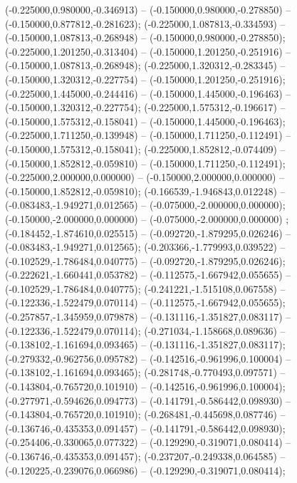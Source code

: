  (-0.225000,0.980000,-0.346913) -- (-0.150000,0.980000,-0.278850) -- (-0.150000,0.877812,-0.281623);
 (-0.225000,1.087813,-0.334593) -- (-0.150000,1.087813,-0.268948) -- (-0.150000,0.980000,-0.278850);
 (-0.225000,1.201250,-0.313404) -- (-0.150000,1.201250,-0.251916) -- (-0.150000,1.087813,-0.268948);
 (-0.225000,1.320312,-0.283345) -- (-0.150000,1.320312,-0.227754) -- (-0.150000,1.201250,-0.251916);
 (-0.225000,1.445000,-0.244416) -- (-0.150000,1.445000,-0.196463) -- (-0.150000,1.320312,-0.227754);
 (-0.225000,1.575312,-0.196617) -- (-0.150000,1.575312,-0.158041) -- (-0.150000,1.445000,-0.196463);
 (-0.225000,1.711250,-0.139948) -- (-0.150000,1.711250,-0.112491) -- (-0.150000,1.575312,-0.158041);
 (-0.225000,1.852812,-0.074409) -- (-0.150000,1.852812,-0.059810) -- (-0.150000,1.711250,-0.112491);
 (-0.225000,2.000000,0.000000) -- (-0.150000,2.000000,0.000000) -- (-0.150000,1.852812,-0.059810);
 (-0.166539,-1.946843,0.012248) -- (-0.083483,-1.949271,0.012565) -- (-0.075000,-2.000000,0.000000);
 (-0.150000,-2.000000,0.000000) -- (-0.075000,-2.000000,0.000000) ;
 (-0.184452,-1.874610,0.025515) -- (-0.092720,-1.879295,0.026246) -- (-0.083483,-1.949271,0.012565);
 (-0.203366,-1.779993,0.039522) -- (-0.102529,-1.786484,0.040775) -- (-0.092720,-1.879295,0.026246);
 (-0.222621,-1.660441,0.053782) -- (-0.112575,-1.667942,0.055655) -- (-0.102529,-1.786484,0.040775);
 (-0.241221,-1.515108,0.067558) -- (-0.122336,-1.522479,0.070114) -- (-0.112575,-1.667942,0.055655);
 (-0.257857,-1.345959,0.079878) -- (-0.131116,-1.351827,0.083117) -- (-0.122336,-1.522479,0.070114);
 (-0.271034,-1.158668,0.089636) -- (-0.138102,-1.161694,0.093465) -- (-0.131116,-1.351827,0.083117);
 (-0.279332,-0.962756,0.095782) -- (-0.142516,-0.961996,0.100004) -- (-0.138102,-1.161694,0.093465);
 (-0.281748,-0.770493,0.097571) -- (-0.143804,-0.765720,0.101910) -- (-0.142516,-0.961996,0.100004);
 (-0.277971,-0.594626,0.094773) -- (-0.141791,-0.586442,0.098930) -- (-0.143804,-0.765720,0.101910);
 (-0.268481,-0.445698,0.087746) -- (-0.136746,-0.435353,0.091457) -- (-0.141791,-0.586442,0.098930);
 (-0.254406,-0.330065,0.077322) -- (-0.129290,-0.319071,0.080414) -- (-0.136746,-0.435353,0.091457);
 (-0.237207,-0.249338,0.064585) -- (-0.120225,-0.239076,0.066986) -- (-0.129290,-0.319071,0.080414);
